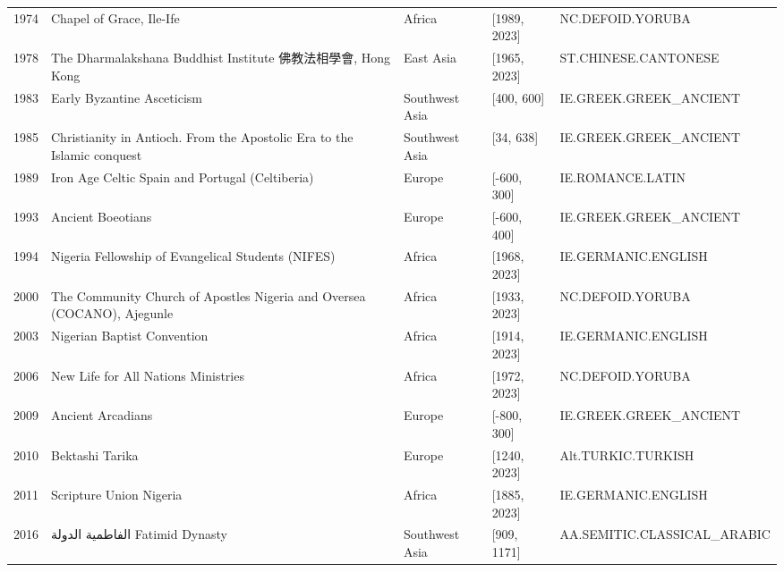 {\begin{longtable}{rp{3.5cm}llp{3.5cm}}
1974 & {\raggedright Chapel of Grace, Ile-Ife} & Africa & [1989, 2023] & {\raggedright NC.\allowbreak{}DEFOID.\allowbreak{}YORUBA} \\
1978 & {\raggedright The Dharmalakshana Buddhist Institute 佛教法相學會, Hong Kong} & East Asia & [1965, 2023] & {\raggedright ST.\allowbreak{}CHINESE.\allowbreak{}CANTONESE} \\
1983 & {\raggedright Early Byzantine Asceticism} & Southwest Asia & [400, 600] & {\raggedright IE.\allowbreak{}GREEK.\allowbreak{}GREEK\_\allowbreak{}ANCIENT} \\
1985 & {\raggedright Christianity in Antioch. From the Apostolic Era to the Islamic conquest} & Southwest Asia & [34, 638] & {\raggedright IE.\allowbreak{}GREEK.\allowbreak{}GREEK\_\allowbreak{}ANCIENT} \\
1989 & {\raggedright Iron Age Celtic Spain and Portugal (Celtiberia)} & Europe & [-600, 300] & {\raggedright IE.\allowbreak{}ROMANCE.\allowbreak{}LATIN} \\
1993 & {\raggedright Ancient Boeotians} & Europe & [-600, 400] & {\raggedright IE.\allowbreak{}GREEK.\allowbreak{}GREEK\_\allowbreak{}ANCIENT} \\
1994 & {\raggedright Nigeria Fellowship of Evangelical Students (NIFES)} & Africa & [1968, 2023] & {\raggedright IE.\allowbreak{}GERMANIC.\allowbreak{}ENGLISH} \\
2000 & {\raggedright The Community Church of Apostles Nigeria and Oversea (COCANO), Ajegunle} & Africa & [1933, 2023] & {\raggedright NC.\allowbreak{}DEFOID.\allowbreak{}YORUBA} \\
2003 & {\raggedright Nigerian Baptist Convention} & Africa & [1914, 2023] & {\raggedright IE.\allowbreak{}GERMANIC.\allowbreak{}ENGLISH} \\
2006 & {\raggedright New Life for All Nations Ministries} & Africa & [1972, 2023] & {\raggedright NC.\allowbreak{}DEFOID.\allowbreak{}YORUBA} \\
2009 & {\raggedright Ancient Arcadians} & Europe & [-800, 300] & {\raggedright IE.\allowbreak{}GREEK.\allowbreak{}GREEK\_\allowbreak{}ANCIENT} \\
2010 & {\raggedright Bektashi Tarika} & Europe & [1240, 2023] & {\raggedright Alt.\allowbreak{}TURKIC.\allowbreak{}TURKISH} \\
2011 & {\raggedright Scripture Union Nigeria} & Africa & [1885, 2023] & {\raggedright IE.\allowbreak{}GERMANIC.\allowbreak{}ENGLISH} \\
2016 & {\raggedright {\arabicfont الفاطمية الدولة} Fatimid Dynasty} & Southwest Asia & [909, 1171] & {\raggedright AA.\allowbreak{}SEMITIC.\allowbreak{}CLASSICAL\_\allowbreak{}ARABIC} \\

\end{longtable}}
